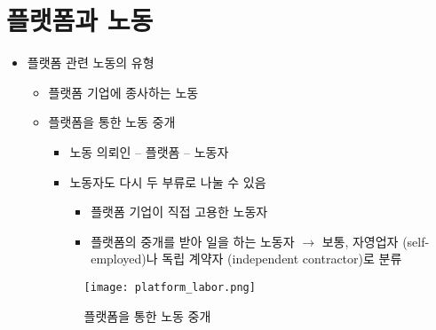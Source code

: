 \section{플랫폼과 노동}\label{sec:}
\begin{itemize}
\item 플랫폼 관련 노동의 유형
	\begin{itemize}
	\item 플랫폼 기업에 종사하는 노동
	\item 플랫폼을 통한 노동 중개
		\begin{itemize}
		\item 노동 의뢰인 -- 플랫폼 -- 노동자
		\item 노동자도 다시 두 부류로 나눌 수 있음
			\begin{itemize}
			\item 플랫폼 기업이 직접 고용한 노동자
			\item 플랫폼의 중개를 받아 일을 하는 노동자 $\rightarrow$ 보통, 자영업자 (self-employed)나 독립 계약자 (independent contractor)로 분류
			\end{itemize}
		\end{itemize}
		
		\begin{figure}[htbp]
		\begin{center}
		\texttt{[image: platform\_labor.png]}
		\caption{플랫폼을 통한 노동 중개}
		\label{fig:platform_labor}
		\end{center}
		\end{figure}		
		

\end{itemize}
\end{itemize}
